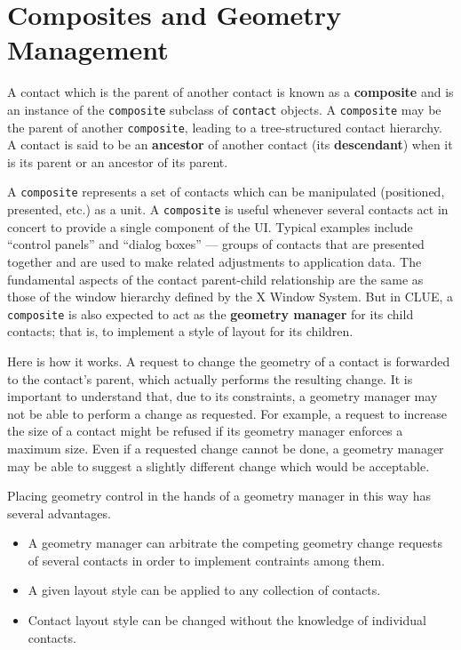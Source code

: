 \section{Composites and Geometry Management\label{sec:composites}}
A contact which is the parent of another contact is known as a
{\bf composite} and is an instance of the {\tt composite}
subclass of {\tt contact} objects. A {\tt composite} may be the parent of another
{\tt composite},
leading to a tree-structured contact hierarchy. A contact is said to be an
{\bf ancestor} of another contact (its 
{\bf descendant}) when
it is its parent or an ancestor of its parent. 

A {\tt composite} represents a set of contacts which can be manipulated
(positioned, presented,
etc.) as a unit.  A {\tt composite} is useful whenever several contacts act in
concert to provide a
single component of the UI.  Typical examples include
``control panels'' and ``dialog boxes'' --- groups of contacts that are presented
together and are used to make related adjustments to application data.  
The fundamental aspects of the contact parent-child relationship are the same as
those of the window hierarchy defined by the X Window System. 
But in CLUE, a {\tt composite} is also expected to act as the {\bf geometry
manager} for its child contacts; that is, to
implement a style of layout for its children. 


Here is how it works.  A request to change the geometry of a contact is
forwarded to the contact's parent, which actually performs the resulting change.
It is important to understand that, due to its constraints, a geometry manager
may not be able to perform a change as requested.  For example, a request to
increase the size of a contact might be refused if its geometry manager enforces
a maximum size.  Even if a requested change cannot be done, a geometry manager
may be able to suggest a slightly different change which would be acceptable.

Placing geometry control in the hands of a geometry manager in this way
has several advantages.
\begin{itemize}
\item   A geometry manager can arbitrate the competing geometry change requests
        of several contacts in order to implement contraints among them.
        
\item   A given layout style can be applied to any collection of contacts.
        
\item   Contact layout style can be changed without the knowledge of individual
        contacts.
\end{itemize}



